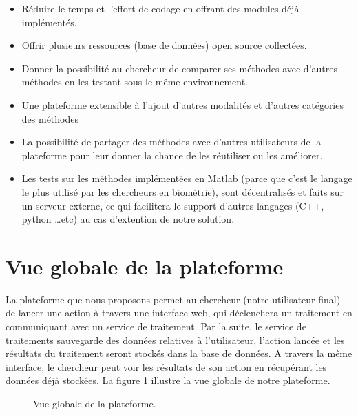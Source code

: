 \begin{itemize}
	\item Réduire le temps et l’effort de codage en offrant des modules déjà implémentés.
	\item Offrir plusieurs ressources (base de données) open source collectées.
	\item Donner la possibilité au chercheur de comparer ses méthodes avec d’autres méthodes en les testant sous le même environnement.
	\item Une plateforme extensible à l’ajout d'autres modalités et d'autres catégories des méthodes
	\item La possibilité de partager des méthodes avec d’autres utilisateurs de la plateforme pour leur donner la chance de les réutiliser ou les améliorer.
	\item Les tests sur les méthodes implémentées en Matlab (parce que c’est le langage le plus utilisé par les chercheurs en biométrie), sont décentralisés et faits sur un serveur externe, ce qui facilitera le support d'autres langages (C++, python …etc) au cas d'extention de notre solution.
\end{itemize}


\clearpage
\section{Vue globale de la plateforme}
La plateforme que nous proposons permet au chercheur (notre utilisateur final) de lancer une action à travers une interface web, qui déclenchera un traitement en communiquant avec un service de traitement. Par la suite, le service de traitements sauvegarde des données relatives à l’utilisateur, l’action lancée et les résultats du traitement seront stockés dans la base de données. A travers la même interface, le chercheur peut voir les résultats de son action en récupérant les données déjà stockées.
La figure \ref{vueplateforme} illustre la vue globale de notre plateforme.

\begin{figure}[H]
	\centering
	\caption{Vue globale de la plateforme.}
	\label{vueplateforme}
\end{figure}


